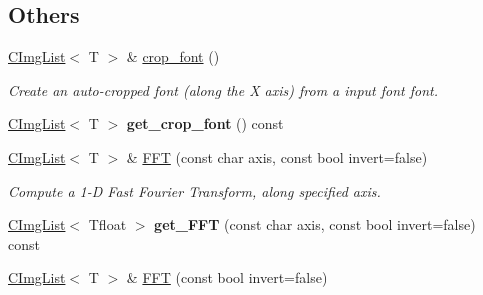 \subsection*{Others}
\label{_amgrp52ef9633d88a7480b3a938ff9eaa2a25}
 \begin{DoxyCompactItemize}
\item 
\hypertarget{structcimg__library_1_1CImgList_a3b57756b26a0473e3539c6af86d876b5}{
\hyperlink{structcimg__library_1_1CImgList}{CImgList}$<$ T $>$ \& \hyperlink{structcimg__library_1_1CImgList_a3b57756b26a0473e3539c6af86d876b5}{crop\_\-font} ()}
\label{structcimg__library_1_1CImgList_a3b57756b26a0473e3539c6af86d876b5}

\begin{DoxyCompactList}\small\item\em Create an auto-\/cropped font (along the X axis) from a input font {\ttfamily font}. \item\end{DoxyCompactList}\item 
\hypertarget{structcimg__library_1_1CImgList_aa240a3e4e9713b62189f8df7fa47a988}{
\hyperlink{structcimg__library_1_1CImgList}{CImgList}$<$ T $>$ {\bfseries get\_\-crop\_\-font} () const }
\label{structcimg__library_1_1CImgList_aa240a3e4e9713b62189f8df7fa47a988}

\item 
\hypertarget{structcimg__library_1_1CImgList_a231161b57fc1e5d813f254f65afefd8b}{
\hyperlink{structcimg__library_1_1CImgList}{CImgList}$<$ T $>$ \& \hyperlink{structcimg__library_1_1CImgList_a231161b57fc1e5d813f254f65afefd8b}{FFT} (const char axis, const bool invert=false)}
\label{structcimg__library_1_1CImgList_a231161b57fc1e5d813f254f65afefd8b}

\begin{DoxyCompactList}\small\item\em Compute a 1-\/D Fast Fourier Transform, along specified axis. \item\end{DoxyCompactList}\item 
\hypertarget{structcimg__library_1_1CImgList_ae9e7074da9c9955e37e9eebbd5bd9c22}{
\hyperlink{structcimg__library_1_1CImgList}{CImgList}$<$ Tfloat $>$ {\bfseries get\_\-FFT} (const char axis, const bool invert=false) const }
\label{structcimg__library_1_1CImgList_ae9e7074da9c9955e37e9eebbd5bd9c22}

\item 
\hypertarget{structcimg__library_1_1CImgList_a9cc4c99d1c9ce55a3a75cfdf4d00bb0b}{
\hyperlink{structcimg__library_1_1CImgList}{CImgList}$<$ T $>$ \& \hyperlink{structcimg__library_1_1CImgList_a9cc4c99d1c9ce55a3a75cfdf4d00bb0b}{FFT} (const bool invert=false)}
\label{structcimg__library_1_1CImgList_a9cc4c99d1c9ce55a3a75cfdf4d00bb0b}


\end{DoxyCompactItemize}

